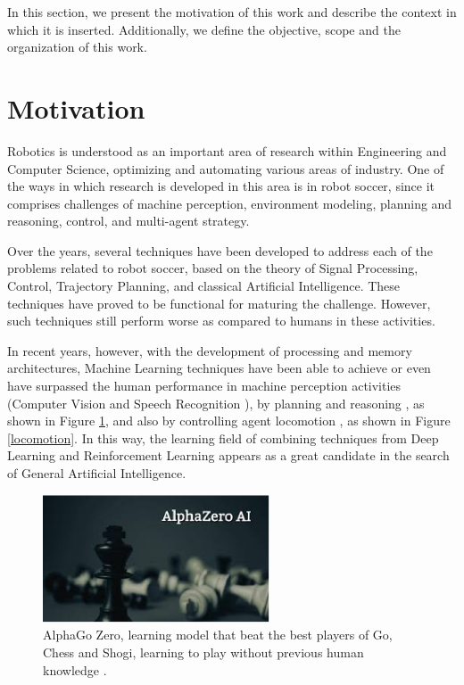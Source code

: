 In this section, we present the motivation of this work and describe the context in which it is inserted. Additionally, we define the objective, scope and the organization of this work.

\section{Motivation}

Robotics is understood as an important area of research within Engineering and Computer Science, optimizing and automating various areas of industry. One of the ways in which research is developed in this area is in robot soccer, since it comprises challenges of machine perception, environment modeling, planning and reasoning, control, and multi-agent strategy.

Over the years, several techniques have been developed to address each of the problems related to robot soccer, based on the theory of Signal Processing, Control, Trajectory Planning, and classical Artificial Intelligence. These techniques have proved to be functional for maturing the challenge. However, such techniques still perform worse as compared to humans in these activities.

In recent years, however, with the development of processing and memory architectures, Machine Learning techniques have been able to achieve or even have surpassed the human performance in machine perception activities (Computer Vision \cite{DBLP:journals/corr/LuT14} and Speech Recognition \cite{DBLP:journals/corr/XiongDHSSSYZ16a}), by planning and reasoning \cite{DBLP:journals/corr/abs-1712-01815}, as shown in Figure \ref{alphazero}, and also by controlling agent locomotion \cite{DBLP:journals/corr/HeessTSLMWTEWER17}, as shown in Figure \ref{locomotion}. In this way, the learning field of combining techniques from Deep Learning and Reinforcement Learning appears as a great candidate in the search of General Artificial Intelligence.


\begin{figure}[ht]
\centering
\includegraphics[width=0.6\textwidth]{Cap1/AlphaZero}
\caption{AlphaGo Zero, learning model that beat the best players of Go, Chess and Shogi, learning to play without previous human knowledge \cite{DBLP:journals/corr/abs-1712-01815}.}
\label{alphazero}
\end{figure}



